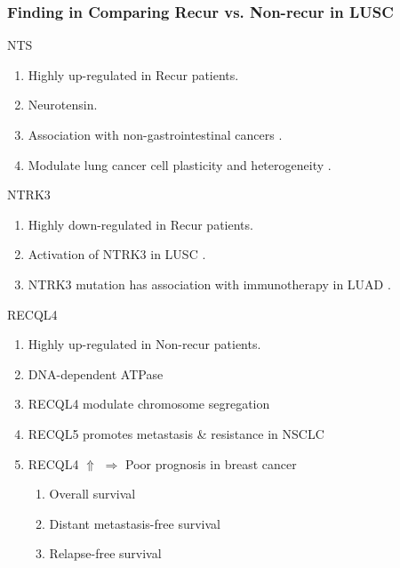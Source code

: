 \documentclass{beamer}
\begin{document}
    \begin{frame}[allowframebreaks]
        \frametitle{Finding in Comparing Recur vs. Non-recur in LUSC}

        \begin{block}{NTS}
            \begin{enumerate}
                \item Highly up-regulated in Recur patients.
                \item Neurotensin.
                \item Association with non-gastrointestinal cancers \cite{NTS1}.
                \item Modulate lung cancer cell plasticity and heterogeneity \cite{NTS2}.
            \end{enumerate}
        \end{block}

        \begin{block}{NTRK3}
            \begin{enumerate}
                \item Highly down-regulated in Recur patients.
                \item Activation of NTRK3 in LUSC \cite{NTRK3-1}.
                \item NTRK3 mutation has association with immunotherapy in LUAD \cite{NTRK3-2}.
            \end{enumerate}
        \end{block}

        \begin{block}{RECQL4}
            \begin{enumerate}
                \item Highly up-regulated in Non-recur patients.
                \item DNA-dependent ATPase \cite{RECQL4-1}
                \item RECQL4 modulate chromosome segregation \cite{RECQL4-1}
                \item RECQL5 promotes metastasis \& resistance in NSCLC \cite{RECQL4-3}
                \item RECQL4 $\Uparrow$ $\Rightarrow$ Poor prognosis in breast cancer \cite{RECQL4-2}
                \begin{enumerate}
                    \item Overall survival
                    \item Distant metastasis-free survival
                    \item Relapse-free survival
                \end{enumerate}
            \end{enumerate}
        \end{block}
    \end{frame}
\end{document}
